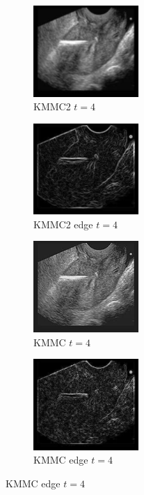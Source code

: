 \documentclass[a4paper,10pt,twocolumn]{article}
\begin{document}
\begin{center}
\begin{figure}[!htb]
		
		\begin{subfigure}[d!]{4cm}
			\includegraphics[width=4cm]{image/im5/im_5_4}
			\caption{KMMC2 $t = 4$}
		\end{subfigure}
		\begin{subfigure}[e!]{4cm}
			\includegraphics[width=4cm]{image/im5/im_5_4_edge}
			\caption{KMMC2 edge $t = 4$}
		\end{subfigure}
		\begin{subfigure}[f!]{4cm}
			\includegraphics[width=4cm]{image/im5/im_5_4_norm}
			\caption{KMMC $t = 4$}
		\end{subfigure}
		\begin{subfigure}[g!]{4cm}
			\includegraphics[width=4cm]{image/im5/im_5_4_norm_edge}
			\caption{KMMC edge $t = 4$}
		\end{subfigure}
		

\end{figure}
\end{center}
\end{document}
